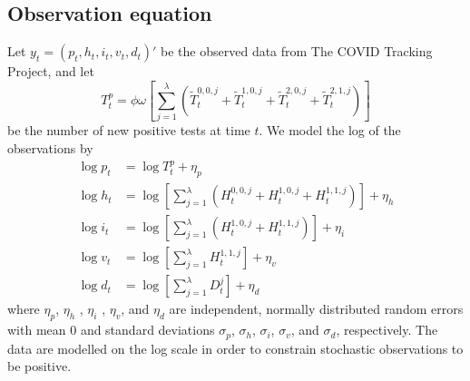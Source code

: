 \documentclass{article}
\begin{document}
\subsection{Observation equation \label{sec:obs}}

Let $y_t = (p_t, h_t, i_t, v_t, d_t)'$ be the observed data from The COVID Tracking Project, and let \[T^p_t = \phi\omega\left[\sum_{j=1}^{\lambda} \left(\tilde{T}^{0,0,j}_t + \tilde{T}^{1,0,j}_t + \tilde{T}^{2,0,j}_t + \tilde{T}^{2,1,j}_t\right)\right]\] be the number of new positive tests at time $t$. We model the log of the observations by
\begin{align}
\log p_t &= \log T^p_t + \eta_p \label{eqn:obspos} \\
\log h_t &= \log \left[ \sum_{j=1}^{\lambda} \left(H^{0,0,j}_t + H^{1,0,j}_t + H^{1,1,j}_t\right)\right] + \eta_h \label{eqn:obshosp} \\
\log i_t &= \log \left[ \sum_{j=1}^{\lambda} \left(H^{1,0,j}_t + H^{1,1,j}_t\right)\right] + \eta_i \label{eqn:obsicu} \\
\log v_t &= \log \left[ \sum_{j=1}^{\lambda}H^{1,1,j}_t\right] + \eta_v \label{eqn:obsvent} \\
\log d_t &= \log \left[ \sum_{j=1}^\lambda D^j_t \right] + \eta_d \label{eqn:obsdeath}
\end{align}
where $\eta_p$, $\eta_h$ , $\eta_i$ , $\eta_v$, and $\eta_d$ are independent, normally distributed random errors with mean 0 and standard deviations $\sigma_p$, $\sigma_h$, $\sigma_i$, $\sigma_v$, and $\sigma_d$, respectively. The data are modelled on the log scale in order to constrain stochastic observations to be positive.
\end{document}
